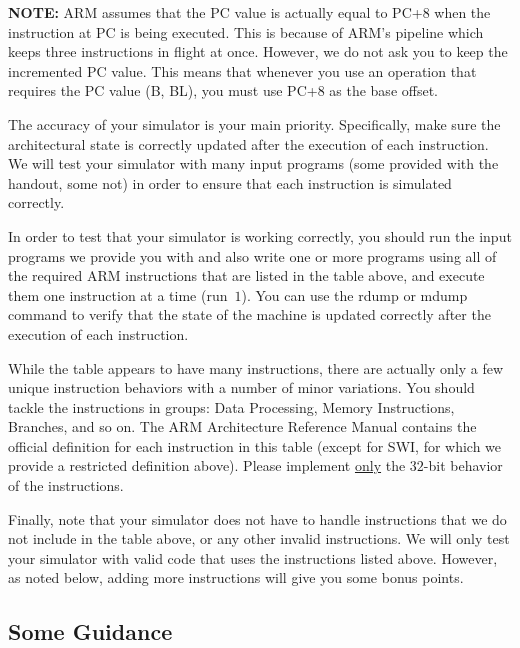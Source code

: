 \documentclass{article}
\begin{document}
\textbf{NOTE:} ARM assumes that the PC value is actually equal to 
PC+8 when the
instruction at PC is being executed. This is because of ARM's pipeline
which keeps three instructions in flight at once. However, we do not
ask you to keep the incremented PC value. This means that whenever you
use an operation that requires the PC value (B, BL), you must use PC+8
as the base offset.

The accuracy of your simulator is your main priority. Specifically,
make sure the architectural state is correctly updated after the
execution of each instruction. We will test your simulator with many
input programs (some provided with the handout, some not) in order to
ensure that each instruction is simulated correctly.

In order to test that your simulator is working correctly, you should
run the input programs we provide you with and also write one or more
programs using all of the required ARM instructions that are listed in
the table above, and execute them one instruction at a time 
(run~$1$). You can use the rdump or mdump
command to verify that the state of the
machine is updated correctly after the execution of each instruction.

While the table appears to have many instructions, there are actually
only a few unique instruction behaviors with a number of minor
variations. You should tackle the instructions in groups: Data
Processing, Memory Instructions, Branches, and so on. The ARM Architecture
Reference Manual contains the official definition for each instruction
in this table (except for SWI, for which we provide a restricted
definition above). Please implement \underline{only} the $32$-bit
behavior of the instructions.

Finally, note that your simulator does not have to handle instructions
that we do not include in the table above, or any other invalid
instructions. We will only test your simulator with valid code that
uses the instructions listed above.  However, as noted below, adding
more instructions will give you some bonus points.  

\subsection{Some Guidance}
\end{document}
